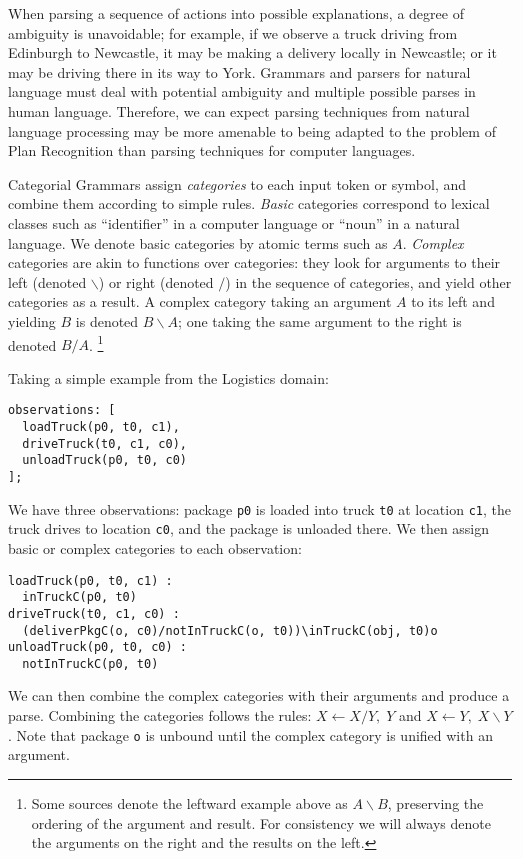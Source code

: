 When parsing a sequence of actions into possible explanations, a degree of ambiguity is unavoidable; for example, if we observe a truck driving from Edinburgh to Newcastle, it may be making a delivery locally in Newcastle; or it may be driving there in its way to York. Grammars and parsers for natural language must deal with potential ambiguity and multiple possible parses in human language. Therefore, we can expect parsing techniques from natural language processing may be more amenable to being adapted to the problem of Plan Recognition than parsing techniques for computer languages.

Categorial Grammars\cite{bib:ccg} assign \emph{categories} to each input token or symbol, and combine them according to simple rules. \emph{Basic} categories correspond to lexical classes such as ``identifier'' in a computer language or ``noun'' in a natural language. We denote basic categories by atomic terms such as $A$. \emph{Complex} categories are akin to functions over categories: they look for arguments to their left (denoted $\backslash$) or right (denoted $/$) in the sequence of categories, and yield other categories as a result. A complex category taking an argument $A$ to its left and yielding $B$ is denoted $B\backslash A$; one taking the same argument to the right is denoted $B/A$. \footnote{Some sources denote the leftward example above as $A\backslash B$, preserving the ordering of the argument and result. For consistency we will always denote the arguments on the right and the results on the left.}

Taking a simple example from the Logistics domain:

\begin{lstlisting}
observations: [
  loadTruck(p0, t0, c1),
  driveTruck(t0, c1, c0),
  unloadTruck(p0, t0, c0)
];
\end{lstlisting}

We have three observations: package \texttt{p0} is loaded into truck \texttt{t0} at location \texttt{c1}, the truck drives to location \texttt{c0}, and the package is unloaded there. We then assign basic or complex categories to each observation:

\begin{lstlisting}
loadTruck(p0, t0, c1) :
  inTruckC(p0, t0)
driveTruck(t0, c1, c0) :
  (deliverPkgC(o, c0)/notInTruckC(o, t0))\inTruckC(obj, t0)o
unloadTruck(p0, t0, c0) :
  notInTruckC(p0, t0)
\end{lstlisting}


We can then combine the complex categories with their arguments and produce a parse. Combining the categories follows the rules: $ X\leftarrow X/Y,\; Y$ and $ X\leftarrow Y,\; X\backslash Y$. Note that package \texttt{o} is unbound until the complex category is unified with an argument.

